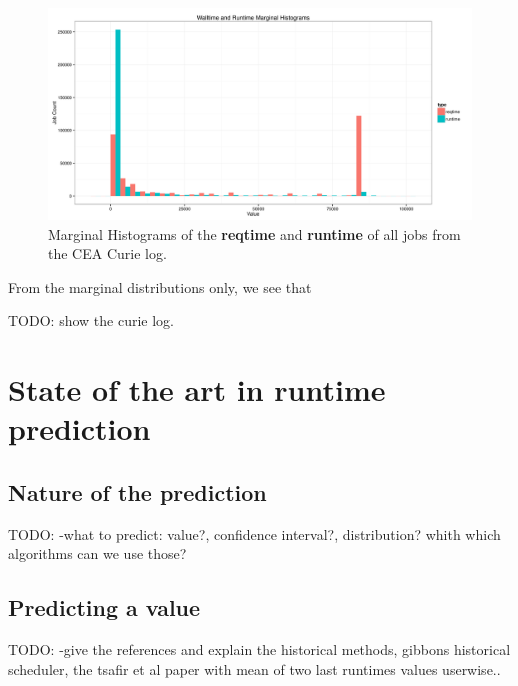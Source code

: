 \documentclass{article}
\begin{document}
\begin{figure}[ht]
  \centering
        \includegraphics[width=\textwidth]{../../wallimage-0.png}
        \caption{Marginal Histograms of the \textbf{reqtime} and \textbf{runtime} of all jobs from the CEA Curie log.}
\label{fig:_wall_run_for_report_pdf}
\end{figure}

From the marginal distributions only, we see that





TODO: show the curie log.



\section{State of the art in \textbf{runtime} prediction}


\subsection{Nature of the prediction}
\label{sub:nature_of_the_prediction}

TODO: -what to predict: value?, confidence interval?, distribution? whith which algorithms can we use those?


\subsection{Predicting a value}
\label{sub:predicting_a_value}

TODO: -give the references and explain the historical methods, gibbons historical scheduler, the tsafir et al paper with mean of two last runtimes values userwise..
\end{document}
